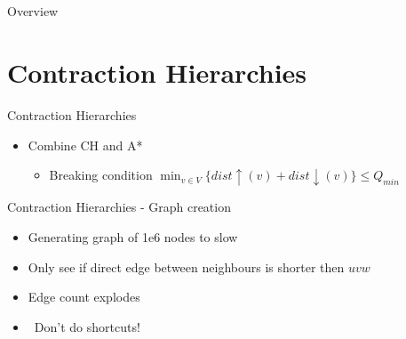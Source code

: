 \section*{}

\usetikzlibrary{decorations.text}
\usetikzlibrary{positioning}
\begin{frame}{Overview}
    \tableofcontents
\end{frame}




\section{Contraction Hierarchies}
\begin{frame}{Contraction Hierarchies}
    \begin{itemize}
        \item Combine CH and A*
        \begin{itemize}
            \item Breaking condition $\min_{v \in V} \{dist\uparrow(v) + dist\downarrow(v)\} \leq Q_{min}$
        \end{itemize}
    \end{itemize}
\end{frame}


\begin{frame}{Contraction Hierarchies - Graph creation}
    \begin{itemize}
        \item Generating graph of 1e6 nodes to slow
        \item Only see if direct edge between neighbours is shorter then $uvw$
        \item Edge count explodes
        \item \textrightarrow~Don't do shortcuts!
    \end{itemize}
\end{frame}

